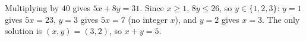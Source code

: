 Multiplying by $40$ gives $5x+8y=31$. Since $x\ge1$, $8y\le26$, so $y\in\{1,2,3\}$: $y=1$ gives $5x=23$, $y=3$ gives $5x=7$ (no integer $x$), and $y=2$ gives $x=3$. The only solution is $(x,y)=(3,2)$, so $x+y=\boxed{5}$.
